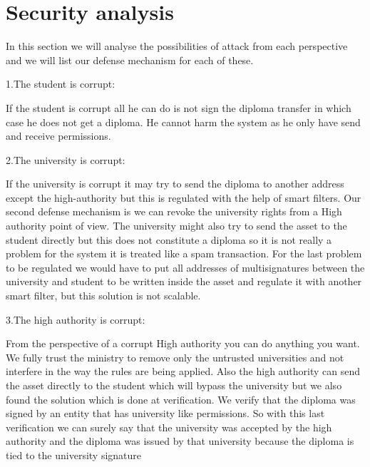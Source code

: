 \documentclass[conference]{IEEEtran}
\begin{document}
\section{Security analysis}
In this section we will analyse the possibilities of attack from each perspective and we will list our defense mechanism for each of these.\par
1.The student is corrupt:\par
If the student is corrupt all he can do is not sign the diploma transfer in which case he does not get a diploma. He cannot harm the system as he only have send and receive permissions.\par
2.The university is corrupt:\par
If the university is corrupt it may try to send the diploma to another address except the high-authority but this is regulated with the help of smart filters. Our second defense mechanism is we can revoke the university rights from a High authority point of view. The university might also try to send the asset to the student directly but this does not constitute a diploma so it is not really a problem for the system it is treated like a spam transaction. For the last problem to be regulated we would have to put all addresses of multisignatures between the university and student to be written inside the asset and regulate it with another smart filter, but this solution is not scalable.\par
3.The high authority is corrupt:\par
From the perspective of a corrupt High authority you can do anything you want. We fully trust the ministry to remove only the untrusted universities and not interfere in the way the rules are being applied.
Also the high authority can send the asset directly to the student which will bypass the university but we also found the solution which is done at verification. We verify that the diploma was signed by an entity that has university like permissions. So with this last verification we can surely say that the university was accepted by the high authority and the diploma was issued by that university because the diploma is tied to the university signature
\end{document}
